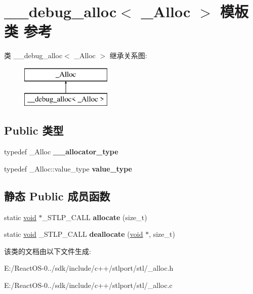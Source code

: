 \hypertarget{class____debug__alloc}{}\section{\+\_\+\+\_\+debug\+\_\+alloc$<$ \+\_\+\+Alloc $>$ 模板类 参考}
\label{class____debug__alloc}
类 \+\_\+\+\_\+debug\+\_\+alloc$<$ \+\_\+\+Alloc $>$ 继承关系图\+:\begin{figure}[H]
\begin{center}
\leavevmode
\includegraphics[height=2.000000cm]{class____debug__alloc}
\end{center}
\end{figure}
\subsection*{Public 类型}
\begin{DoxyCompactItemize}
\item 
\mbox{\label{class____debug__alloc_ad1f392fe9ad26cd1d7ab501ca82550bb}} 
typedef \+\_\+\+Alloc {\bfseries \+\_\+\+\_\+allocator\+\_\+type}
\item 
\mbox{\label{class____debug__alloc_a82d673a94b6fa2a49dc72271de93a337}} 
typedef \+\_\+\+Alloc\+::value\+\_\+type {\bfseries value\+\_\+type}
\end{DoxyCompactItemize}
\subsection*{静态 Public 成员函数}
\begin{DoxyCompactItemize}
\item 
\mbox{\label{class____debug__alloc_a2ba4f485aeb85de84b5c49643a64034d}} 
static \hyperlink{interfacevoid}{void} $\ast$\+\_\+\+S\+T\+L\+P\+\_\+\+C\+A\+LL {\bfseries allocate} (size\+\_\+t)
\item 
\mbox{\label{class____debug__alloc_a51af93e450608c7611cbbe55ca203162}} 
static \hyperlink{interfacevoid}{void} \+\_\+\+S\+T\+L\+P\+\_\+\+C\+A\+LL {\bfseries deallocate} (\hyperlink{interfacevoid}{void} $\ast$, size\+\_\+t)
\end{DoxyCompactItemize}


该类的文档由以下文件生成\+:\begin{DoxyCompactItemize}
\item 
E\+:/\+React\+O\+S-\/0../sdk/include/c++/stlport/stl/\+\_\+alloc.\+h\item 
E\+:/\+React\+O\+S-\/0../sdk/include/c++/stlport/stl/\+\_\+alloc.\+c\end{DoxyCompactItemize}
